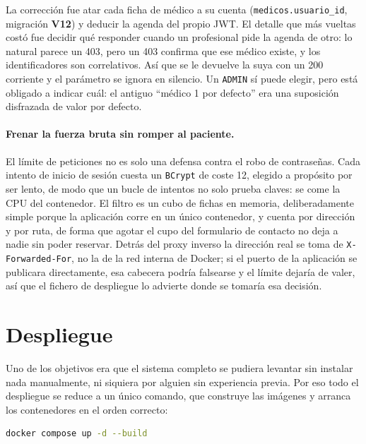 \documentclass[12pt,a4paper]{report}
\begin{document}
La corrección fue atar cada ficha de médico a su cuenta (\texttt{medicos.usuario\_id}, migración \textbf{V12}) y deducir la agenda del propio JWT. El detalle que más vueltas costó fue decidir qué responder cuando un profesional pide la agenda de otro: lo natural parece un 403, pero un 403 confirma que ese médico existe, y los identificadores son correlativos. Así que se le devuelve la suya con un 200 corriente y el parámetro se ignora en silencio. Un \texttt{ADMIN} sí puede elegir, pero está obligado a indicar cuál: el antiguo ``médico 1 por defecto'' era una suposición disfrazada de valor por defecto.

\paragraph{Frenar la fuerza bruta sin romper al paciente.} El límite de peticiones no es solo una defensa contra el robo de contraseñas. Cada intento de inicio de sesión cuesta un \texttt{BCrypt} de coste 12, elegido a propósito por ser lento, de modo que un bucle de intentos no solo prueba claves: se come la CPU del contenedor. El filtro es un cubo de fichas en memoria, deliberadamente simple porque la aplicación corre en un único contenedor, y cuenta por dirección y por ruta, de forma que agotar el cupo del formulario de contacto no deja a nadie sin poder reservar. Detrás del proxy inverso la dirección real se toma de \texttt{X-Forwarded-For}, no la de la red interna de Docker; si el puerto de la aplicación se publicara directamente, esa cabecera podría falsearse y el límite dejaría de valer, así que el fichero de despliegue lo advierte donde se tomaría esa decisión.

\section{Despliegue}

Uno de los objetivos era que el sistema completo se pudiera levantar sin instalar nada manualmente, ni siquiera por alguien sin experiencia previa. Por eso todo el despliegue se reduce a un único comando, que construye las imágenes y arranca los contenedores en el orden correcto:

\begin{lstlisting}[language=bash]
docker compose up -d --build
\end{lstlisting}
\end{document}

